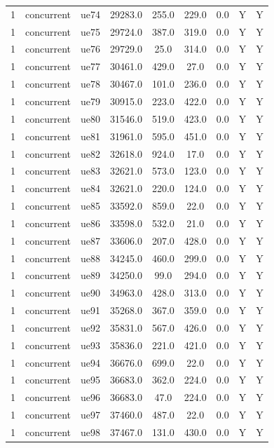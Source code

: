 \begin{table}[ht]
\begin{tabular}{|c|c|c|c|c|c|c|c|c|}
1 & concurrent & ue74 & 29283.0 & 255.0 & 229.0 & 0.0 & Y & Y \\
1 & concurrent & ue75 & 29724.0 & 387.0 & 319.0 & 0.0 & Y & Y \\
1 & concurrent & ue76 & 29729.0 & 25.0 & 314.0 & 0.0 & Y & Y \\
1 & concurrent & ue77 & 30461.0 & 429.0 & 27.0 & 0.0 & Y & Y \\
1 & concurrent & ue78 & 30467.0 & 101.0 & 236.0 & 0.0 & Y & Y \\
1 & concurrent & ue79 & 30915.0 & 223.0 & 422.0 & 0.0 & Y & Y \\
1 & concurrent & ue80 & 31546.0 & 519.0 & 423.0 & 0.0 & Y & Y \\
1 & concurrent & ue81 & 31961.0 & 595.0 & 451.0 & 0.0 & Y & Y \\
1 & concurrent & ue82 & 32618.0 & 924.0 & 17.0 & 0.0 & Y & Y \\
1 & concurrent & ue83 & 32621.0 & 573.0 & 123.0 & 0.0 & Y & Y \\
1 & concurrent & ue84 & 32621.0 & 220.0 & 124.0 & 0.0 & Y & Y \\
1 & concurrent & ue85 & 33592.0 & 859.0 & 22.0 & 0.0 & Y & Y \\
1 & concurrent & ue86 & 33598.0 & 532.0 & 21.0 & 0.0 & Y & Y \\
1 & concurrent & ue87 & 33606.0 & 207.0 & 428.0 & 0.0 & Y & Y \\
1 & concurrent & ue88 & 34245.0 & 460.0 & 299.0 & 0.0 & Y & Y \\
1 & concurrent & ue89 & 34250.0 & 99.0 & 294.0 & 0.0 & Y & Y \\
1 & concurrent & ue90 & 34963.0 & 428.0 & 313.0 & 0.0 & Y & Y \\
1 & concurrent & ue91 & 35268.0 & 367.0 & 359.0 & 0.0 & Y & Y \\
1 & concurrent & ue92 & 35831.0 & 567.0 & 426.0 & 0.0 & Y & Y \\
1 & concurrent & ue93 & 35836.0 & 221.0 & 421.0 & 0.0 & Y & Y \\
1 & concurrent & ue94 & 36676.0 & 699.0 & 22.0 & 0.0 & Y & Y \\
1 & concurrent & ue95 & 36683.0 & 362.0 & 224.0 & 0.0 & Y & Y \\
1 & concurrent & ue96 & 36683.0 & 47.0 & 224.0 & 0.0 & Y & Y \\
1 & concurrent & ue97 & 37460.0 & 487.0 & 22.0 & 0.0 & Y & Y \\
1 & concurrent & ue98 & 37467.0 & 131.0 & 430.0 & 0.0 & Y & Y \\

\end{tabular}
\end{table}
